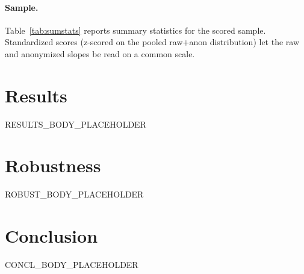 \documentclass[12pt]{article}
\begin{document}
\paragraph{Sample.} Table~\ref{tab:sumstats} reports summary statistics for the scored
sample. Standardized scores (z-scored on the pooled raw$+$anon distribution) let the raw and
anonymized slopes be read on a common scale.

\section{Results}\label{sec:res}
RESULTS_BODY_PLACEHOLDER

\section{Robustness}\label{sec:rob}
ROBUST_BODY_PLACEHOLDER

\section{Conclusion}\label{sec:concl}
CONCL_BODY_PLACEHOLDER
\end{document}
